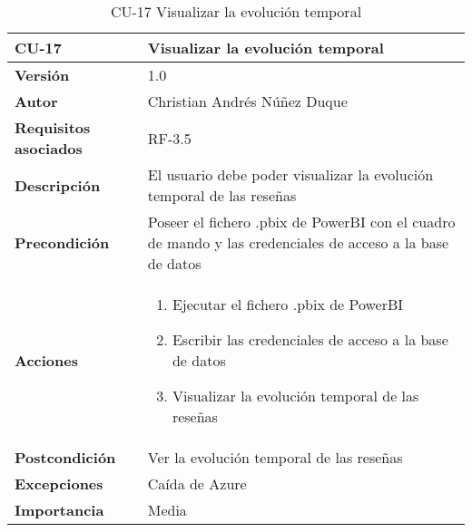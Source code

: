 \begin{table}[p]
	\centering
	\begin{tabularx}{\linewidth}{ p{} p{} }
		\toprule
		\textbf{CU-17}    & \textbf{Visualizar la evolución temporal}\\
		\toprule
		\textbf{Versión}              & 1.0    \\
		\textbf{Autor}                & Christian Andrés Núñez Duque \\
		\textbf{Requisitos asociados} & RF-3.5 \\
		\textbf{Descripción}          & El usuario debe poder visualizar la evolución temporal de las reseñas \\
		\textbf{Precondición}         & Poseer el fichero .pbix de PowerBI con el cuadro de mando y las credenciales de acceso a la base de datos \\
		\textbf{Acciones}             &
		\begin{enumerate}
			\def\labelenumi{\arabic{enumi}.}
			\tightlist
			\item Ejecutar el fichero .pbix de PowerBI
			\item Escribir las credenciales de acceso a la base de datos
			\item Visualizar la evolución temporal de las reseñas
		\end{enumerate}\\
		\textbf{Postcondición}        & Ver la evolución temporal de las reseñas \\
		\textbf{Excepciones}          & Caída de Azure \\
		\textbf{Importancia}          & Media \\
		\bottomrule
	\end{tabularx}
	\caption{CU-17 Visualizar la evolución temporal}
\end{table}


